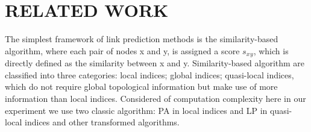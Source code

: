 \documentclass[onecolumn,preprintnumbers,amsmath,amssymb]{revtex4}
\begin{document}



\section*{RELATED WORK\protect}
The simplest framework of link prediction methods is the similarity-based algorithm, where each pair of nodes x and y, is assigned a score $s_x$$_y$, which is directly defined as the similarity between x and y. Similarity-based algorithm are classified into three categories: local indices; global indices; quasi-local indices, which do not require global topological information but make use of more information than local indices\cite{SV}. Considered of computation complexity here in our experiment we use two classic algorithm: PA in local indices and LP in quasi-local indices and other transformed algorithms.
\end{document}
